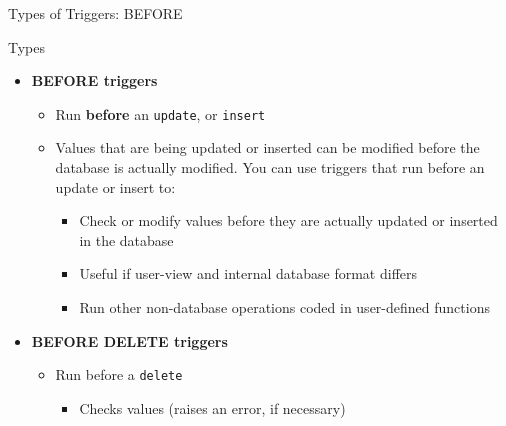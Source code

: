 \documentclass[aspectratio=169, xcolor=dvipsnames]{beamer}
\begin{document}
\begin{frame}{Types of Triggers: BEFORE}
    \begin{block}{Types}
        \begin{itemize}[<+->]
            \item \textbf{BEFORE triggers}
            \begin{itemize}
                \item[$\triangleright$] Run \textbf{before} an \texttt{update}, or \texttt{insert}
                \item[$\triangleright$] Values that are being updated or inserted can be modified before the database is actually modified. You can use triggers that run before an update or insert to:
                \begin{itemize}
                    \item Check or modify values before they are actually updated or inserted in the database
                    \item Useful if user-view and internal database format differs
                    \item Run other non-database operations coded in user-defined functions
                \end{itemize}
            \end{itemize}
            \item \textbf{BEFORE DELETE triggers}
            \begin{itemize}
                \item[$\triangleright$] Run before a \texttt{delete}
                \begin{itemize}
                    \item Checks values (raises an error, if necessary)
                \end{itemize}
            \end{itemize}
        \end{itemize}
    \end{block}
\end{frame}
\end{document}
